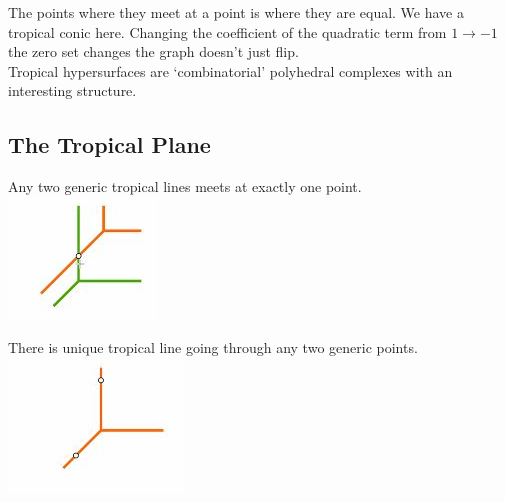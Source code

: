 \documentclass{article}
\begin{document}
The points where they meet at a point is where they are equal. We have a tropical conic here. Changing the coefficient of the quadratic term from $1 \to -1$ the zero set changes the graph doesn't just flip.\\

Tropical hypersurfaces are `combinatorial' polyhedral complexes with an interesting structure.\\

\subsection{The Tropical Plane}
\begin{minipage}{0.48\textwidth}
  Any two generic tropical lines meets at exactly one point.\\\vspace{30pt}
  \centering
  \includegraphics{./figures/L2.5}
\end{minipage}
\begin{minipage}{0.48\textwidth}
  There is unique tropical line going through any two generic points.\\\vspace{30pt}
  \centering
  \includegraphics{./figures/L2.6}
\end{minipage}
\end{document}
